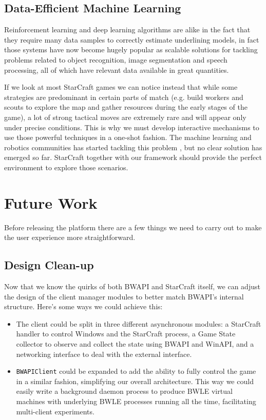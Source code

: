 \subsection{Data-Efficient Machine Learning}

Reinforcement learning and deep learning algorithms are alike in the
fact that they require many data samples to correctly estimate underlining
models, in fact those systems have now become hugely popular as scalable
solutions for tackling problems related to object recognition, image
segmentation and speech processing, all of which have relevant data available in
great quantities.

If we look at most StarCraft games we can notice instead that while some
strategies are predominant in certain parts of match (e.g. build workers and
scouts to explore the map and gather resources during the early stages of the
game), a lot of strong tactical moves are extremely rare and will appear only
under precise conditions. This is why we must develop interactive mechanisms to
use those powerful techniques in a one-shot fashion. The machine learning and
robotics communities has started tackling this problem
\citep{deisenroth2015gaussian, assael2015data, kingma2014semi,
  rasmus2014denoising}, but no clear solution has emerged so far. StarCraft
together with our framework should provide the perfect environment to explore
those scenarios.

\section{Future Work}

Before releasing the platform there are a few things we need to carry out to
make the user experience more straightforward.

\subsection{Design Clean-up}

Now that we know the quirks of both BWAPI and StarCraft itself, we can adjust
the design of the client manager modules to better match BWAPI's internal
structure. Here's some ways we could achieve this:

\begin{itemize}
\item The client could be split in three different asynchronous modules: a
  StarCraft handler to control Windows and the StarCraft process, a Game State
  collector to observe and collect the state using BWAPI and WinAPI, and a
  networking interface to deal with the external interface.
\item \texttt{BWAPIClient} could be expanded to add the ability to fully control
  the game in a similar fashion, simplifying our overall architecture. This way
  we could easily write a background daemon process to produce BWLE virtual
  machines with underlying BWLE processes running all the time, facilitating
  multi-client experiments.
\end{itemize}

